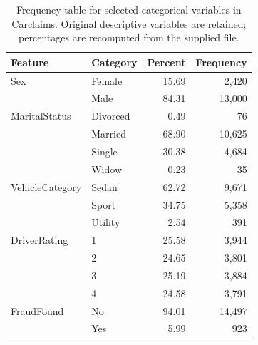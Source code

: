 \begin{table}[tbp]\centering\footnotesize
\caption{Frequency table for selected categorical variables in Carclaims. Original descriptive variables are retained; percentages are recomputed from the supplied file.}\label{tab:frequency}
\begin{tabular}{llrr}\toprule Feature & Category & Percent & Frequency\\\midrule
Sex & Female & 15.69 & 2,420\\
 & Male & 84.31 & 13,000\\
MaritalStatus & Divorced & 0.49 & 76\\
 & Married & 68.90 & 10,625\\
 & Single & 30.38 & 4,684\\
 & Widow & 0.23 & 35\\
VehicleCategory & Sedan & 62.72 & 9,671\\
 & Sport & 34.75 & 5,358\\
 & Utility & 2.54 & 391\\
DriverRating & 1 & 25.58 & 3,944\\
 & 2 & 24.65 & 3,801\\
 & 3 & 25.19 & 3,884\\
 & 4 & 24.58 & 3,791\\
FraudFound & No & 94.01 & 14,497\\
 & Yes & 5.99 & 923\\
\bottomrule\end{tabular}\end{table}
